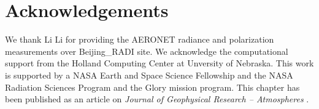 \section{Acknowledgements}

We thank Li Li for providing the AERONET radiance and polarization
measurements over Beijing\_RADI site. We acknowledge the computational
support from the Holland Computing Center at Unversity of Nebraska.
This work is supported by a NASA Earth and Space Science
Fellowship and the NASA Radiation Sciences Program and the Glory mission
program. This chapter has been published as an article on
\textit{Journal of Geophysical Research – Atmospheres} \citep{Xu15b}.

